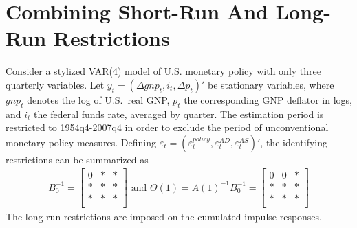\section[Combining Short-Run And Long-Run Restrictions]{Combining Short-Run And Long-Run Restrictions\label{ex:CombiningShortRunAndLongRunRestrictions}}
Consider a stylized VAR{(4)} model of U.S. monetary policy with only three quarterly variables.
Let \(y_t = (\Delta gnp_t, i_t, \Delta p_t)'\) be stationary variables,
  where \(gnp_t\) denotes the log of U.S.\ real GNP,
  \(p_t\) the corresponding GNP deflator in logs,
  and \(i_t\) the federal funds rate, averaged by quarter.
The estimation period is restricted to 1954q4-2007q4 in order to exclude the period of unconventional monetary policy measures.
Defining \(\varepsilon_t = (\varepsilon_t^{policy}, \varepsilon_t^{AD}, \varepsilon_t^{AS})'\),
  the identifying restrictions can be summarized as
\begin{align*}
B_{0}^{-1}  =
\begin{bmatrix}
0 & * & *\\
* & * & *\\
* & * & *\\
\end{bmatrix} \text{~and~}
\Theta(1) = A(1)^{-1} B_{0}^{-1} =
\begin{bmatrix}
0 & 0 & *\\
* & * & *\\
* & * & *\\
\end{bmatrix}
\end{align*}
The long-run restrictions are imposed on the cumulated impulse responses.

